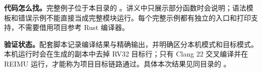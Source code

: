 \documentclass[UTF8,11pt,a4paper,fontset=none]{ctexart}
\begin{document}

\textbf{代码怎么找。}完整例子位于本目录的 。讲义中只展示部分函数时会说明；语法模板和错误示例不能直接当成完整模块运行。每个完整示例都有独立的入口和打印支持，不需要借用项目参考 Rust 编译器。

\textbf{验证状态。}配套脚本记录编译结果与精确输出，并明确区分本机模式和目标模式。本机运行时会在生成的副本中去掉 RV32 目标行；只有 Clang 22 交叉编译并在 REIMU 运行，才能称为项目目标链路通过。具体本次结果见同目录的 。

\clearpage
\tableofcontents






\end{document}
